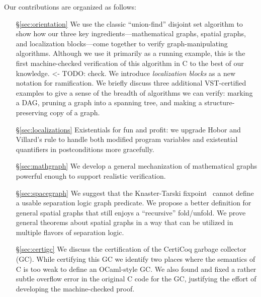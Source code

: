 Our contributions are organized as follows:
\begin{itemize}
\item[\S\ref{sec:orientation}] We use the classic ``union-find'' disjoint set algorithm to show {\color{magenta}how our three key ingredients---mathematical graphs, spatial graphs, and localization blocks---come together to verify 
graph-manipulating algorithms.} 
Although we use it primarily as a running example, {\color{magenta}this is the first machine-checked verification of this algorithm in C to the best of our knowledge.} 
{\color{blue} <- TODO: check.}  
{\color{magenta} We introduce \emph{localization blocks} as a new notation for ramification. We briefly discuss three additional VST-certified examples to give a sense of the breadth of algorithms we can verify: marking a DAG, pruning a graph into a spanning tree, and making a structure-preserving copy of a 
graph.}
\item[\S\ref{sec:localizations}] Existentials for fun and profit: we upgrade Hobor and Villard's  rule to handle both modified program variables and existential quantifiers in postconditions more gracefully.
\item[\S\ref{sec:mathgraph}] {\color{magenta}We develop a general mechanization of mathematical graphs powerful enough to support realistic verification.}
\item[\S\ref{sec:spacegraph}] We suggest that the Knaster-Tarski fixpoint~\cite{tarski:fixpoint} cannot define a usable separation logic graph predicate.  We propose a better definition for general spatial graphs that still enjoys a ``recursive'' fold/unfold.  We prove general theorems about spatial graphs in a way that can be utilized in multiple flavors of separation logic. %
\item[\S\ref{sec:certigc}] We discuss the certification of the CertiCoq garbage collector (GC). While certifying this GC we identify two places where the semantics of C is too weak to define an OCaml-style GC. We also found and fixed a rather subtle overflow error in the original C code for the GC, justifying the effort of developing the machine-checked proof.

\end{itemize}
